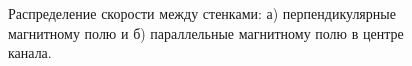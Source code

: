 \begin{figure}[h]
	
\caption{Распределение скорости между стенками: а) перпендикулярные магнитному полю и б) параллельные магнитному полю в центре канала.}
\label{fig:velocity:ideal}
\end{figure}

